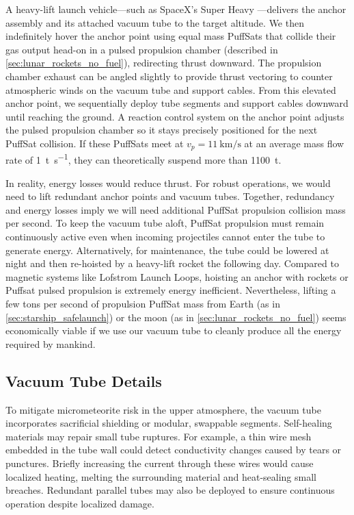 \documentclass{article}
\begin{document}
A heavy-lift launch vehicle—such as SpaceX’s Super Heavy \cite{spacex_super_heavy}—delivers the anchor assembly and its attached vacuum tube to the target altitude.   We then indefinitely hover the anchor point using equal mass PuffSats that collide their gas output head-on in a pulsed propulsion chamber (described in \autoref{sec:lunar_rockets_no_fuel}), redirecting thrust downward. The propulsion chamber exhaust can be angled slightly to provide thrust vectoring to counter atmospheric winds on the vacuum tube and support cables. From this elevated anchor point, we sequentially deploy tube segments and support cables downward until reaching the ground. A reaction control system on the anchor point adjusts the pulsed propulsion chamber so it stays precisely positioned for the next PuffSat collision.  If these PuffSats meet at $v_p=\SI{11}{\kilo\meter\per\second}$ at an average mass flow rate of \SI{1}{\tonne\per\second}, they can theoretically suspend more than \SI{1100}{\tonne}.   

In reality, energy losses would reduce thrust.   For robust operations, we would need to lift redundant anchor points and vacuum tubes.  Together, redundancy and energy losses imply we will need additional PuffSat propulsion collision mass per second.  To keep the vacuum tube aloft, PuffSat propulsion must remain continuously active even when incoming projectiles cannot enter the tube to generate energy. Alternatively, for maintenance, the tube could be lowered at night and then re-hoisted by a heavy-lift rocket the following day.  Compared to magnetic systems like Lofstrom Launch Loops, hoisting an anchor with rockets or Puffsat pulsed propulsion is extremely energy inefficient. Nevertheless, lifting a few tons per second of propulsion PuffSat mass from Earth (as in \autoref{sec:starship_safelaunch}) or the moon (as in \autoref{sec:lunar_rockets_no_fuel}) seems economically viable if we use our vacuum tube to cleanly produce all the energy required by mankind. 

\subsection{Vacuum Tube Details}\label{sec:vacuum_tube_details}
To mitigate micrometeorite risk in the upper atmosphere, the vacuum tube incorporates sacrificial shielding or modular, swappable segments. Self-healing materials \cite{self_healing_material_survey} may repair small tube ruptures.  For example, a thin wire mesh embedded in the tube wall could detect conductivity changes caused by tears or punctures. Briefly increasing the current through these wires would cause localized heating, melting the surrounding material and heat-sealing small breaches. Redundant parallel tubes may also be deployed to ensure continuous operation despite localized damage.  
\end{document}
